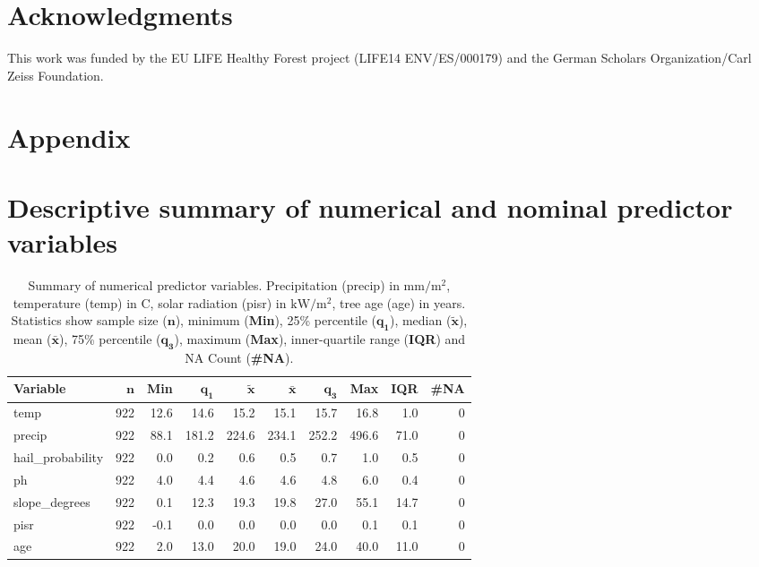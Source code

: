\documentclass[review]{elsarticle}
\begin{document}
\section{Acknowledgments}
This work was funded by the EU LIFE Healthy Forest project (LIFE14 ENV/ES/000179) and the German Scholars Organization/Carl Zeiss Foundation.

\section{Appendix}

\appendix
\gdef\thesection{\Alph{section}} %
\makeatletter
\renewcommand\@seccntformat[1]{Appendix \csname the#1\endcsname.\hspace{0.5em}}
\makeatother

\section{Descriptive summary of numerical and nominal predictor variables}

\begin{table}[H]
	\centering
	\begingroup\footnotesize
	\begin{tabular}{lrrrrrrrrr}
	 \textbf{Variable} & $\mathbf{n}$ & \textbf{Min} & $\mathbf{q_1}$ & $\mathbf{\widetilde{x}}$ & $\mathbf{\bar{x}}$ & $\mathbf{q_3}$ & \textbf{Max} & \textbf{IQR} & \textbf{\#NA} \\
		\hline
	temp & 922 & 12.6 &  14.6 &  15.2 &  15.1 &  15.7 &  16.8 &  1.0 & 0 \\
		precip & 922 & 88.1 & 181.2 & 224.6 & 234.1 & 252.2 & 496.6 & 71.0 & 0 \\
		hail\_probability & 922 &  0.0 &   0.2 &   0.6 &   0.5 &   0.7 &   1.0 &  0.5 & 0 \\
		ph & 922 &  4.0 &   4.4 &   4.6 &   4.6 &   4.8 &   6.0 &  0.4 & 0 \\
		slope\_degrees & 922 &  0.1 &  12.3 &  19.3 &  19.8 &  27.0 &  55.1 & 14.7 & 0 \\
		pisr & 922 & -0.1 &   0.0 &   0.0 &   0.0 &   0.0 &   0.1 &  0.1 & 0 \\
		age & 922 &  2.0 &  13.0 &  20.0 &  19.0 &  24.0 &  40.0 & 11.0 & 0 \\
		\end{tabular}
	\endgroup
	\caption{Summary of numerical predictor variables. Precipitation (precip) in $\mathrm{mm/m^{2}}$, temperature (temp) in \degree C, solar radiation (pisr) in $\mathrm{kW/m^{2}}$, tree age (age) in years. Statistics show sample size ($\mathbf{n}$), minimum (\textbf{Min}), 25\% percentile ($\mathbf{q_1}$), median ($\mathbf{\widetilde{x}}$), mean ($\mathbf{\bar{x}}$), 75\% percentile ($\mathbf{q_3}$), maximum (\textbf{Max}), inner-quartile range (\textbf{IQR}) and NA Count (\textbf{\#NA}).}
	\label{}
	\end{table}
\end{document}

